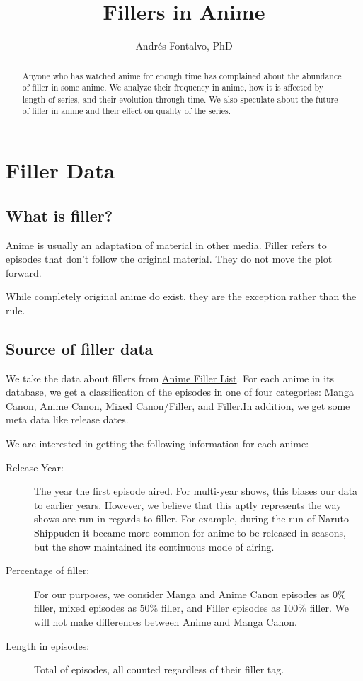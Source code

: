 \documentclass{article}
\title{Fillers in Anime}
\author{Andrés Fontalvo, PhD}
\begin{document}
\maketitle

\begin{abstract}
  Anyone who has watched anime for enough time has complained about the abundance of filler in some anime.
  We analyze their frequency in anime, how it is affected by length of series, and their evolution through time.
  We also speculate about the future of filler in anime and their effect on quality of the series.
\end{abstract}
  
\section{Filler Data}
\subsection{What is filler?}
Anime is usually an adaptation of material in other media.
Filler refers to episodes that don't follow the original material.
They do not move the plot forward.

While completely original anime do exist, they are the exception rather than the rule.

\subsection{Source of filler data}
We take the data about fillers from \href{www.animefillerlist.com}{Anime Filler List}.
For each anime in its database, we get a classification of the episodes in one of four categories: Manga Canon, Anime Canon, Mixed Canon/Filler, and Filler.In addition, we get some meta data like release dates.

We are interested in getting the following information for each anime:
\begin{description}
  \item[Release Year:] The year the first episode aired.
    For multi-year shows, this biases our data to earlier years.
    However, we believe that this aptly represents the way shows are run in regards to filler.
    For example, during the run of Naruto Shippuden it became more common for anime to be released in seasons, but the show maintained its continuous mode of airing.
  \item[Percentage of filler:] For our purposes, we consider Manga and Anime Canon episodes as $0\%$ filler, mixed episodes as $50\%$ filler, and Filler episodes as $100\%$ filler.
  We will not make differences between Anime and Manga Canon.
  \item[Length in episodes:] Total of episodes, all counted regardless of their filler tag.
\end{description}
\end{document}
